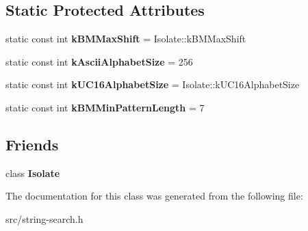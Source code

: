 \subsection*{Static Protected Attributes}
\begin{DoxyCompactItemize}
\item 
\hypertarget{classv8_1_1internal_1_1_string_search_base_ad471d0ad669c9cdabae5866875a9ecaa}{}static const int {\bfseries k\+B\+M\+Max\+Shift} = Isolate\+::k\+B\+M\+Max\+Shift\label{classv8_1_1internal_1_1_string_search_base_ad471d0ad669c9cdabae5866875a9ecaa}

\item 
\hypertarget{classv8_1_1internal_1_1_string_search_base_af4517d240db7190709f29d1d37e40165}{}static const int {\bfseries k\+Ascii\+Alphabet\+Size} = 256\label{classv8_1_1internal_1_1_string_search_base_af4517d240db7190709f29d1d37e40165}

\item 
\hypertarget{classv8_1_1internal_1_1_string_search_base_a6c6e53551e567bd63a758f1450515272}{}static const int {\bfseries k\+U\+C16\+Alphabet\+Size} = Isolate\+::k\+U\+C16\+Alphabet\+Size\label{classv8_1_1internal_1_1_string_search_base_a6c6e53551e567bd63a758f1450515272}

\item 
\hypertarget{classv8_1_1internal_1_1_string_search_base_a92b11d18d2e45bda7dd25674c58369b0}{}static const int {\bfseries k\+B\+M\+Min\+Pattern\+Length} = 7\label{classv8_1_1internal_1_1_string_search_base_a92b11d18d2e45bda7dd25674c58369b0}

\end{DoxyCompactItemize}
\subsection*{Friends}
\begin{DoxyCompactItemize}
\item 
\hypertarget{classv8_1_1internal_1_1_string_search_base_aba4f0964bdacf2bbf62cf876e5d28d0a}{}class {\bfseries Isolate}\label{classv8_1_1internal_1_1_string_search_base_aba4f0964bdacf2bbf62cf876e5d28d0a}

\end{DoxyCompactItemize}


The documentation for this class was generated from the following file\+:\begin{DoxyCompactItemize}
\item 
src/string-\/search.\+h\end{DoxyCompactItemize}
